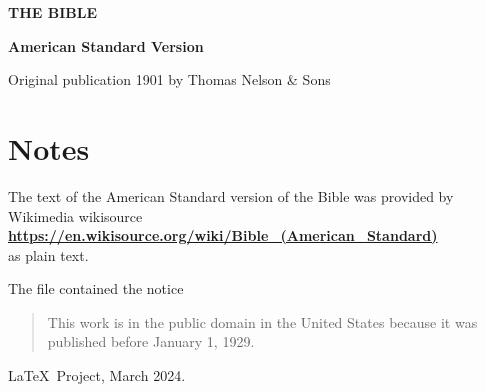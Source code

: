 \documentclass[
  twoside,hidelinks
  ]{memoir}
\makeatletter
\let\@starttoc\ori@starttoc
\renewcommand\tableofcontents{%
  \onecolumn
  \chapter*{\contentsname
        \@mkboth{%
           \MakeUppercase\contentsname}{\MakeUppercase\contentsname}}%
    \@starttoc{toc}%
    \twocolumn
    }
\makeatother
\begin{document}
\frontmatter
\thispagestyle{empty}

\vspace*{1cm}


%
%
\tagmcbegin{}%
\centerline{\HUGE\leavevmode{}\textbf{THE BIBLE}}
\tagmcend
\tagstructend

\vspace{1cm}
%
\tagmcbegin{}%
\centerline{\huge\textbf{American Standard Version}}
\tagmcend
\tagstructend


\vspace{2in}

%
\tagmcbegin{}%
\centerline{Original publication 1901 by Thomas Nelson \& Sons}
\tagmcend
\tagstructend

\tagstructend %


\clearpage
\thispagestyle{empty}

\chapter{Notes}

\begingroup
  \setlength\parindent{0pt}
  \setlength\parskip{\bigskipamount}


The text of the American Standard version of the Bible was provided by
Wikimedia wikisource\\
\textbf{\url{https://en.wikisource.org/wiki/Bible_(American_Standard)}}\\
as plain text.

The file contained the notice

\begin{quote}
This work is in the public domain in the United States because it was
published before January 1, 1929.
  
\end{quote}


  
\LaTeX\ Project, March 2024.

\endgroup

\clearpage
\tableofcontents

\mainmatter
\twocolumn


\end{document}
